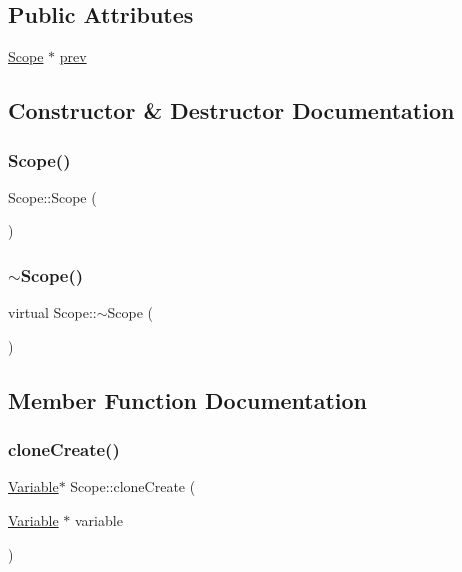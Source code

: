 \subsection*{Public Attributes}
\begin{DoxyCompactItemize}
\item 
\hyperlink{classScope}{Scope} $\ast$ \hyperlink{classScope_abc7b9357aa6fae81075bca080ea73d5f}{prev}
\end{DoxyCompactItemize}


\subsection{Constructor \& Destructor Documentation}
\mbox{\label{classScope_a17c806f9852bb4454ed5709564945373}} 
\subsubsection{\texorpdfstring{Scope()}{Scope()}}
{\footnotesize\ttfamily Scope\+::\+Scope (\begin{DoxyParamCaption}{ }\end{DoxyParamCaption})}

\mbox{\label{classScope_af19fa415c0496acf5667982b584c23d3}} 
\subsubsection{\texorpdfstring{$\sim$\+Scope()}{~Scope()}}
{\footnotesize\ttfamily virtual Scope\+::$\sim$\+Scope (\begin{DoxyParamCaption}{ }\end{DoxyParamCaption})\hspace{0.3cm}{\ttfamily [virtual]}}



\subsection{Member Function Documentation}
\mbox{\label{classScope_aa723099076a40daa24e7818c6dd1c259}} 
\subsubsection{\texorpdfstring{clone\+Create()}{cloneCreate()}}
{\footnotesize\ttfamily \hyperlink{classVariable}{Variable}$\ast$ Scope\+::clone\+Create (\begin{DoxyParamCaption}\item[{\hyperlink{classVariable}{Variable} $\ast$}]{variable }\end{DoxyParamCaption})}

